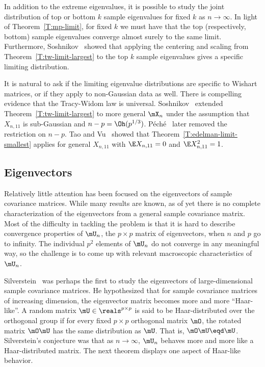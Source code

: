 In addition to the extreme eigenvalues, it is possible to study the joint distribution of top or bottom $k$ sample eigenvalues for fixed $k$ as
$n \to \infty$.  In light of Theorem~\ref{T:mp-limit}, for fixed $k$ we must have that the top (respectively, bottom) sample eigenvalues converge almost surely to the same limit.  Furthermore, Soshnikov~\cite{soshnikov2002nud} showed that applying the centering and scaling from Theorem~\ref{T:tw-limit-largest} to the top $k$ sample eigenvalues gives a specific limiting distribution.

It is natural to ask if the limiting eigenvalue distributions are specific to Wishart matrices, or if they apply to non-Gaussian data as well.  There is compelling evidence that the Tracy-Widom law is universal.   Soshnikov~\cite{soshnikov2002nud} extended Theorem~\ref{T:tw-limit-largest} to more general $\mX_n$ under the assumption that $X_{n,11}$ is sub-Gaussian and $n-p = \Oh(p^{1/3})$.  P\'ech\'e~\cite{peche2008url} later removed the restriction on $n-p$.  Tao and Vu~\cite{tao2009rmd} showed that Theorem~\ref{T:edelman-limit-smallest} applies for general $X_{n,11}$ with $\E X_{n,11} = 0$ and $\E X_{n,11}^2 = 1$.


\subsection{Eigenvectors}

Relatively little attention has been focused on the eigenvectors of sample covariance matrices.  While many results are known, as of yet there is no complete characterization of the eigenvectors from a general sample covariance matrix.  Most of the difficulty in tackling the problem is that it is hard to describe convergence properties of $\mU_n$, the $p\times p$ matrix of eigenvectors, when $n$ and $p$ go to infinity.  The individual $p^2$ elements of $\mU_n$ do not converge in any meaningful way, so the challenge is to come up with relevant macroscopic characteristics of $\mU_n$.

Silverstein~\cite{silverstein1979reg} was perhaps the first to study the eigenvectors of large-dimensional sample covariance matrices.  He hypothesized that for sample covariance matrices of increasing dimension, the eigenvector matrix becomes more and more ``Haar-like''.  A random matrix $\mU \in \reals^{p\times p}$ is said to be Haar-distributed over the orthogonal group if for every fixed $p \times p$ orthogonal matrix $\mO$, the rotated matrix $\mO \mU$ has the same distribution as $\mU$.  That is, $\mO \mU \eqd \mU$.  Silverstein's conjecture was that as $n \to \infty$, $\mU_n$ behaves more and more like a Haar-distributed matrix.  The next theorem displays one aspect of Haar-like behavior.


